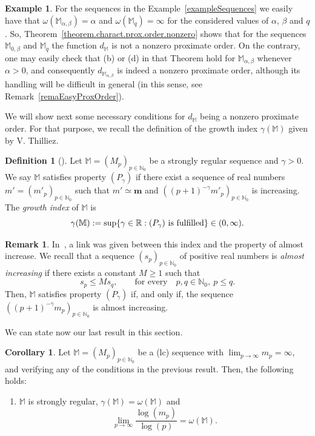 \documentclass[11pt,a4paper]{article}
\theoremstyle{definition}
\newtheorem{cor}[theo]{Corollary}
\newtheorem{defi}[theo]{Definition}
\newtheorem{rema}[theo]{Remark}
\newtheorem{exam}[theo]{Example}
\newenvironment{coro}{\smallskip\begin{cor}}{\end{cor}\smallskip}
\def\a{\alpha}
\def\b{\beta}
\def\o{\omega}
\def\ga{\gamma}
\def\N{\mathbb{N}}
\def\R{\mathbb{R}}
\def\M{\mathbb{M}}
\def\bM{\mathbb{M}}%
\def\m{\boldsymbol{m}}
\def\no{\nonumber}
\begin{document}
\begin{exam}\label{exampleOmega}
For the sequences in the Example~\ref{exampleSequences} we easily have that $\o(\M_{\a,\b})=\a$  and $\o(\M_q)=\infty$ for the considered values of $\a$, $\b$ and $q$. So, Theorem~\ref{theorem.charact.prox.order.nonzero} shows that for the sequences $\M_{0,\b}$ and $\M_q$ the function $d_{\M}$ is not a nonzero proximate order. On the contrary, one may easily check that (b) or (d) in that Theorem hold for $\M_{\a,\b}$ whenever $\a>0$, and consequently $d_{\M_{\a,\b}}$ is indeed a nonzero proximate order, although its handling will be difficult in general (in this sense, see Remark~\ref{remaEasyProxOrder}).
\end{exam}

We will show next some necessary conditions for $d_{\M}$ being a nonzero proximate order. For that purpose, we recall the definition of the growth index $\gamma(\M)$ given by V. Thilliez.

\begin{defi}[\cite{thilliez}]
Let $\bM=(M_{p})_{p\in\N_{0}}$ be a strongly regular sequence and $\ga>0$. We say $\bM$ satisfies property
$\left(P_{\ga}\right)$  if there exist a sequence of real numbers $m'=(m'_{p})_{p\in\N_0}$ such that $m'\simeq\m$ and $\left((p+1)^{-\ga}m'_{p}\right)_{p\in\N_0}$
is increasing.
The \textit{growth index} of $\bM$ is
$$\ga(\bM):=\sup\{\ga\in\R:(P_{\ga})\hbox{ is fulfilled}\}\in(0,\infty).$$
\end{defi}



\begin{rema}\label{remaAlmostIncrease}
In~\cite[Prop.\ 4.12]{JimenezSanz}, a link was given between this index and the property of almost increase. We recall that
a sequence $(s_p)_{p\in\N_0}$ of positive real numbers is \textit{almost increasing} if
there exists a constant $M\geq1$ such that
\begin{equation}
s_p\leq M s_{q}, \qquad \text{for every} \quad p,q \in \N_0,\ p\le q.\no
\end{equation}
Then, $\bM$ satisfies property
$\left(P_{\ga}\right)$  if, and only if, the sequence $\left((p+1)^{-\ga}m_{p}\right)_{p\in\N_0}$ is almost increasing.
\end{rema}

We can state now our last result in this section.


\begin{coro}\label{coroConseqRegularVariation}
Let $\M=(M_p)_{p\in\N_0}$ be a (lc) sequence with $\lim_{p\to\infty} m_p=\infty$, and verifying any of the conditions in the previous result.
Then, the following holds:
\begin{enumerate}
\item[(g)]  $\M$ is strongly regular, $\gamma(\M)=\o(\M)$ and
\begin{equation}\label{limit.logmp.over.logp.omega}
\lim_{p\to\infty} \frac{\log(m_p)}{\log(p)}=\o(\M).
\end{equation}
\end{enumerate}
\end{coro}
\end{document}
